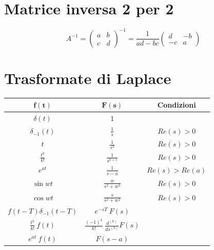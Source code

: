 \documentclass{report}
\theoremstyle{nostyle}
\begin{document}







\section{Matrice inversa 2 per 2}
\[A^{-1} = \begin{pmatrix} a & b \\ c & d \end{pmatrix}^{-1} = \frac{1}{ad - bc} \begin{pmatrix} d & -b \\ -c & a \end{pmatrix}\]





\section{Trasformate di Laplace}
{
\renewcommand{\arraystretch}{3.0} 
\begin{center}
\begin{tabular}{|c|c|c|}
    \hline
    
    $\bm{f(t)}$ &  $\bm{F(s)}$  &  \textbf{Condizioni} \\
    
    \hline
    \rowcolor{gray!15}
    $\delta(t)$ & $1$ &     \\
    
    $\delta_{-1}(t)$ & $\displaystyle \frac{1}{s}$ & $Re(s)>0$\\
    
    \rowcolor{gray!15}
    $t$   &  $\displaystyle \frac{1}{s^2}$ &   $Re(s)>0$ \\
    
    $\displaystyle \frac{t^k}{k!}$  &  $\displaystyle \frac{1}{s^{k+1}}$ & $Re(s)>0$\\
    
    \rowcolor{gray!15}
    $e^{at}$  & $\displaystyle \frac{1}{s-a}$ & $Re(s)>Re(a)$   \\
    
    $\sin wt$  & $\displaystyle \frac{w}{s^2+w^2}$  & $Re(s)>0$\\
    
    \rowcolor{gray!15}
    $\cos wt$  &  $\displaystyle \frac{s}{s^2+w^2}$   & $Re(s)>0$\\
    
    $f(t-T)\delta_{-1}(t-T)$ &  $e^{-sT}\ F(s)$  &     \\
    
    \rowcolor{gray!15}
    $\displaystyle \frac{t^k}{k!}\ f(t)$ & $\displaystyle \frac{(-1)^k}{k!}\  \frac{d^{(k)}}{ds^{(k)}} F(s)$  & \\   
    
    $\displaystyle e^{at}\ f(t)$ & $\displaystyle F(s-a)$ & \\
    \hline
\end{tabular}
\end{center}
}
\end{document}
